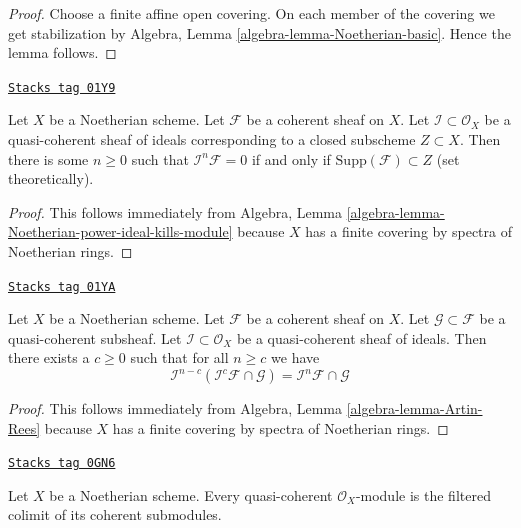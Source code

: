 \begin{proof}
Choose a finite affine open covering.
On each member of the covering we get stabilization by
Algebra, Lemma \ref{algebra-lemma-Noetherian-basic}.
Hence the lemma follows.
\end{proof}

\begin{lemma}
\label{coherent-lemma-power-ideal-kills-sheaf}
\href{https://stacks.math.columbia.edu/tag/01Y9}{\texttt{Stacks tag 01Y9}}

Let $X$ be a Noetherian scheme.
Let $\mathcal{F}$ be a coherent sheaf on $X$.
Let $\mathcal{I} \subset \mathcal{O}_X$ be a quasi-coherent
sheaf of ideals corresponding to a closed subscheme $Z \subset X$.
Then there is some $n \geq 0$ such that $\mathcal{I}^n\mathcal{F} = 0$
if and only if $\text{Supp}(\mathcal{F}) \subset Z$ (set theoretically).
\end{lemma}

\begin{proof}
This follows immediately from
Algebra, Lemma \ref{algebra-lemma-Noetherian-power-ideal-kills-module}
because $X$ has a finite covering by spectra of Noetherian rings.
\end{proof}

\begin{lemma}

\label{coherent-lemma-Artin-Rees}
\href{https://stacks.math.columbia.edu/tag/01YA}{\texttt{Stacks tag 01YA}}

Let $X$ be a Noetherian scheme.
Let $\mathcal{F}$ be a coherent sheaf on $X$.
Let $\mathcal{G} \subset \mathcal{F}$ be a quasi-coherent subsheaf.
Let $\mathcal{I} \subset \mathcal{O}_X$ be a quasi-coherent sheaf of
ideals.
Then there exists a $c \geq 0$ such that for all $n \geq c$ we
have
$$
\mathcal{I}^{n - c}(\mathcal{I}^c\mathcal{F} \cap \mathcal{G})
=
\mathcal{I}^n\mathcal{F} \cap \mathcal{G}
$$
\end{lemma}

\begin{proof}
This follows immediately from
Algebra, Lemma \ref{algebra-lemma-Artin-Rees}
because $X$ has a finite covering by spectra of Noetherian rings.
\end{proof}

\begin{lemma}
\label{coherent-lemma-directed-colimit-coherent}
\href{https://stacks.math.columbia.edu/tag/0GN6}{\texttt{Stacks tag 0GN6}}

Let $X$ be a Noetherian scheme. Every quasi-coherent $\mathcal{O}_X$-module
is the filtered colimit of its coherent submodules.
\end{lemma}

